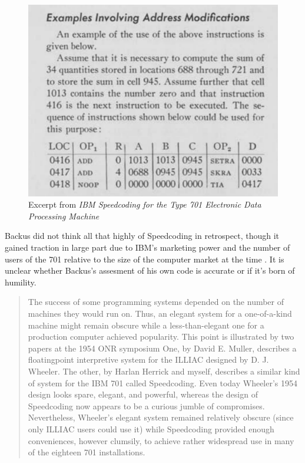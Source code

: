 \begin{figure}[h!]
  \centering
  \includegraphics[width=0.5\linewidth]{resource/ibm-speedcoding-example.png}
  \caption{Excerpt from \textit{IBM Speedcoding for the Type 701 Electronic Data Processing Machine} 
  \cite{IBM_1954_Speedcoding}}
  \label{fig:ibm-speedcoding-example}
\end{figure}

Backus did not think all that highly of Speedcoding in retrospect, though it
gained traction in large part due to IBM's marketing power and the number of
users of the 701 relative to the size of the computer market at the time
\cite{Backus_1980_Programming_in_America_in_1950s}.
It is unclear whether Backus's assesment of his own code is accurate or if
it's born of humility.

\begin{quotation}
    The success of some programming systems depended on the number of machines 
they would run on. Thus, an elegant system for a one-of-a-kind machine might 
remain obscure while a less-than-elegant one for a production computer achieved 
popularity. This point is illustrated by two papers at the 1954 ONR symposium 
One, by David E. Muller, describes a floatingpoint interpretive system for 
the ILLIAC designed by D. J. Wheeler. The other, by Harlan Herrick and myself, 
describes a similar kind of system for the IBM 701 called Speedcoding. Even 
today Wheeler's 1954 design looks spare, elegant, and powerful, whereas the 
design of Speedcoding now appears to be a curious jumble of compromises. 
Nevertheless, Wheeler's elegant system remained relatively obscure (since only 
ILLIAC users could use it) while Speedcoding provided enough conveniences, 
however clumsily, to achieve rather widespread use in many of the eighteen 701 
installations. 
\end{quotation}

